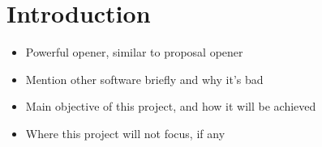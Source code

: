 \section{Introduction}
{\color{red}
	\begin{itemize}
		\item Powerful opener, similar to proposal opener
		\item Mention other software briefly and why it's bad
		\item Main objective of this project, and how it will be achieved
		\item Where this project will not focus, if any
	\end{itemize}
}
